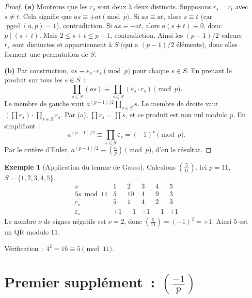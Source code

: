 \documentclass[12pt,a4paper,openany]{book}
\theoremstyle{definition}
\newtheorem{exemple}[definition]{Exemple}
\theoremstyle{plain}
\theoremstyle{remark}
\newcommand{\legendre}[2]{\left(\frac{#1}{#2}\right)}
\DeclareMathOperator{\pgcd}{pgcd}
\begin{document}
\begin{proof}
\textbf{(a)} Montrons que les $r_s$ sont deux à deux distincts. Supposons
$r_s = r_t$ avec $s \neq t$. Cela signifie que $as \equiv \pm at \pmod{p}$.
Si $as \equiv at$, alors $s \equiv t$ (car $\pgcd(a, p) = 1$), contradiction.
Si $as \equiv -at$, alors $a(s + t) \equiv 0$, donc $p \mid (s + t)$.
Mais $2 \leq s + t \leq p - 1$, contradiction. Ainsi les $(p-1)/2$ valeurs
$r_s$ sont distinctes et appartiennent à $S$ (qui a $(p-1)/2$ éléments),
donc elles forment une permutation de $S$.

\medskip
\noindent\textbf{(b)} Par construction, $as \equiv \varepsilon_s \cdot r_s \pmod{p}$
pour chaque $s \in S$. En prenant le produit sur tous les $s \in S$~:
\[
  \prod_{s \in S} (as) \equiv \prod_{s \in S} (\varepsilon_s \cdot r_s) \pmod{p}.
\]
Le membre de gauche vaut $a^{(p-1)/2} \prod_{s \in S} s$. Le membre de droite
vaut $\left(\prod \varepsilon_s\right) \cdot \prod_{s \in S} r_s$.
Par (a), $\prod r_s = \prod s$, et ce produit est non nul modulo $p$.
En simplifiant~:
\[
  a^{(p-1)/2} \equiv \prod_{s \in S} \varepsilon_s = (-1)^\nu \pmod{p}.
\]
Par le critère d'Euler, $a^{(p-1)/2} \equiv \legendre{a}{p} \pmod{p}$, d'où le résultat.
\end{proof}

\begin{exemple}[Application du lemme de Gauss]
\label{ex:gauss-lemma}
Calculons $\legendre{5}{11}$. Ici $p = 11$, $S = \{1, 2, 3, 4, 5\}$.
\[
\begin{array}{c|ccccc}
  s       & 1 & 2 & 3 & 4 & 5 \\ \hline
  5s \bmod 11 & 5 & 10 & 4 & 9 & 3 \\
  r_s     & 5 & 1 & 4 & 2 & 3 \\
  \varepsilon_s & +1 & -1 & +1 & -1 & +1
\end{array}
\]
Le nombre $\nu$ de signes négatifs est $\nu = 2$, donc
$\legendre{5}{11} = (-1)^2 = +1$. Ainsi $5$ est un QR modulo $11$.

Vérification~: $4^2 = 16 \equiv 5 \pmod{11}$. \checkmark
\end{exemple}

\section{Premier supplément~: $\legendre{-1}{p}$}
\label{sec:qr:supplement1}
\end{document}
